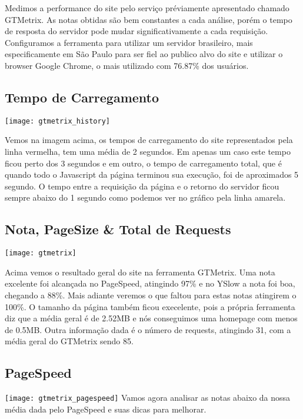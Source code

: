 Medimos a performance do site pelo serviço préviamente apresentado chamado GTMetrix. As notas obtidas são bem constantes a cada análise, porém o tempo de resposta do servidor pode mudar significativamente a cada requisição. Configuramos a ferramenta para utilizar um servidor brasileiro, mais especificamente em São Paulo para ser fiel ao publico alvo do site e utilizar o browser Google Chrome, o mais utilizado com 76.87\%\cite{Chrome} dos usuários.

\subsection{Tempo de Carregamento}
\texttt{[image: gtmetrix\_history]}

Vemos na imagem acima, os tempos de carregamento do site representados pela linha vermelha, tem uma média de 2 segundos. Em apenas um caso este tempo ficou perto dos 3 segundos e em outro, o tempo de carregamento total, que é quando todo o Javascript da página terminou sua execução, foi de aproximados 5 segundo. O tempo entre a requisição da página e o retorno do servidor ficou sempre abaixo do 1 segundo como podemos ver no gráfico pela linha amarela.

\subsection{Nota, PageSize & Total de Requests}
\texttt{[image: gtmetrix]}

Acima vemos o resultado geral do site na ferramenta GTMetrix. Uma nota excelente foi alcançada no PageSpeed, atingindo 97\% e no YSlow a nota foi boa, chegando a 88\%. Mais adiante veremos o que faltou para estas notas atingirem o 100\%. O tamanho da página também ficou execelente, pois a própria ferramenta diz que a média geral é de 2.52MB e nós conseguimos uma homepage com menos de 0.5MB. Outra informação dada é o número de requests, atingindo 31, com a média geral do GTMetrix sendo 85.

\subsection{PageSpeed}
\texttt{[image: gtmetrix\_pagespeed]}
Vamos agora analisar as notas abaixo da nossa média dada pelo PageSpeed e suas dicas para melhorar.

